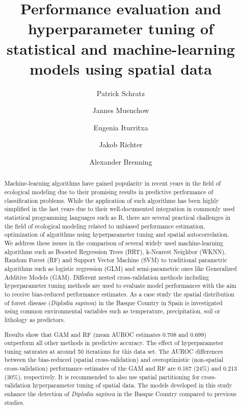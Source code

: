 \documentclass[review]{elsarticle}
\begin{document}
\begin{frontmatter}

	\title{Performance evaluation and hyperparameter tuning of statistical and machine-learning models using spatial data}

	\author[FSU]{Patrick Schratz}

	\author[FSU]{Jannes Muenchow}
	\author[NEIKER]{Eugenia Iturritxa}
	\author[TUDO]{Jakob Richter}
	\author[FSU]{Alexander Brenning}

	\address[FSU]{Department of Geography, GIScience group, Grietgasse 6, 07743, Jena, Germany}
	\address[NEIKER]{NEIKER, Granja Modelo–Arkaute, Apdo. 46, 01080 Vitoria-Gasteiz, Arab, Spain}
	\address[TUDO]{Department of Statistics, TU Dortmund University, Germany}

	\begin{abstract}
		Machine-learning algorithms have gained popularity in recent years in the field of ecological modeling due to their promising results in predictive performance of classification problems.
		While the application of such algorithms has been highly simplified in the last years due to their well-documented integration in commonly used statistical programming languages such as R, there are several practical challenges in the field of ecological modeling related to unbiased performance estimation, optimization of algorithms using hyperparameter tuning and spatial autocorrelation.
		We address these issues in the comparison of several widely used machine-learning algorithms such as Boosted Regression Trees (BRT), k-Nearest Neighbor (WKNN), Random Forest (RF) and Support Vector Machine (SVM) to traditional parametric algorithms such as logistic regression (GLM) and semi-parametric ones like Generalized Additive Models (GAM).
		Different nested cross-validation methods including hyperparameter tuning methods are used to evaluate model performances with the aim to receive bias-reduced performance estimates.
		As a case study the spatial distribution of forest disease (\textit{Diplodia sapinea}) in the Basque Country in Spain is investigated using common environmental variables such as temperature, precipitation, soil or lithology as predictors.

		Results show that GAM and \ac{RF} (mean AUROC estimates 0.708 and 0.699) outperform all other methods in predictive accuracy.
		The effect of hyperparameter tuning saturates at around 50 iterations for this data set.
		The AUROC differences between the bias-reduced (spatial cross-validation) and overoptimistic (non-spatial cross-validation) performance estimates of the GAM and RF are 0.167 (24\%) and 0.213 (30\%), respectively.
		It is recommended to also use spatial partitioning for cross-validation hyperparameter tuning of spatial data.
		The models developed in this study enhance the detection of \textit{Diplodia sapinea} in the Basque Country compared to previous studies.
	\end{abstract}


\end{frontmatter}
\end{document}
